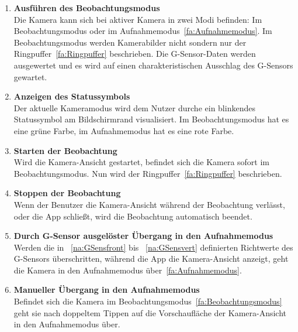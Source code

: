 \begin{enumerate}
\item \label{fa:Beobachtungsmodus}\textbf{Ausführen des Beobachtungsmodus} \hfill \\
Die Kamera kann sich bei aktiver Kamera in zwei Modi befinden: Im Beobachtungsmodus oder im Aufnahmemodus~\eqref{fa:Aufnahmemodus}.
Im Beobachtungsmodus werden Kamerabilder nicht  sondern nur der \gls{Ringpuffer}~\eqref{fa:Ringpuffer} beschrieben. Die \gls{G-Sensor}-Daten werden ausgewertet und es wird auf einen charakteristischen Ausschlag des G-Sensors gewartet.

\item \label{fa:Statussymbol}\textbf{Anzeigen des Statussymbols} \hfill \\
Der aktuelle Kameramodus wird dem Nutzer durche ein blinkendes Statussymbol am Bildschirmrand visualisiert. Im Beobachtungsmodus hat es eine grüne Farbe, im Aufnahmemodus hat es eine rote Farbe.

\item \label{fa:camStart}\textbf{Starten der Beobachtung} \hfill \\
Wird die Kamera-Ansicht gestartet, befindet sich die Kamera sofort im Beobachtungsmodus. Nun wird der \gls{Ringpuffer}~\eqref{fa:Ringpuffer} beschrieben.

\item \textbf{Stoppen der Beobachtung} \hfill \\
Wenn der Benutzer die Kamera-Ansicht während der Beobachtung verlässt, oder die \gls{App} schließt, wird die Beobachtung automatisch beendet.

\item \label{fa:automUebergang}\textbf{Durch \gls{G-Sensor} ausgelöster Übergang in den Aufnahmemodus} \hfill \\
Werden die in ~\eqref{na:GSensfront} bis ~\eqref{na:GSensvert} definierten Richtwerte des G-Sensors überschritten, während die \gls{App} die Kamera-Ansicht anzeigt, geht die Kamera in den Aufnahmemodus über~\eqref{fa:Aufnahmemodus}. 

\item \label{fa:manUebergang}\textbf{Manueller Übergang in den Aufnahmemodus} \hfill \\
Befindet sich die Kamera im Beobachtungsmodus~\eqref{fa:Beobachtungsmodus} geht sie nach doppeltem Tippen auf die Vorschaufläche der Kamera-Ansicht in den Aufnahmemodus über.


\end{enumerate}
